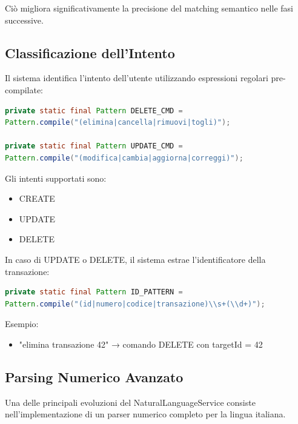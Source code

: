 Ciò migliora significativamente la precisione del matching semantico nelle fasi successive.

\subsection{Classificazione dell'Intento}

Il sistema identifica l'intento dell'utente utilizzando espressioni regolari pre-compilate:

\bigskip

\begin{lstlisting}[language=Java]
private static final Pattern DELETE_CMD =
Pattern.compile("(elimina|cancella|rimuovi|togli)");

private static final Pattern UPDATE_CMD =
Pattern.compile("(modifica|cambia|aggiorna|correggi)");
\end{lstlisting}

Gli intenti supportati sono:

\begin{itemize}
    \item CREATE
    \item UPDATE
    \item DELETE
\end{itemize}

In caso di UPDATE o DELETE, il sistema estrae l'identificatore della transazione:

\bigskip
\begin{lstlisting}[language=Java]
private static final Pattern ID_PATTERN =
Pattern.compile("(id|numero|codice|transazione)\\s+(\\d+)");
\end{lstlisting}

\bigskip

Esempio:

\begin{itemize}
    \item "elimina transazione 42" → comando DELETE con targetId = 42
\end{itemize}

\subsection{Parsing Numerico Avanzato}

Una delle principali evoluzioni del NaturalLanguageService consiste nell'implementazione di un parser numerico completo per la lingua italiana.

